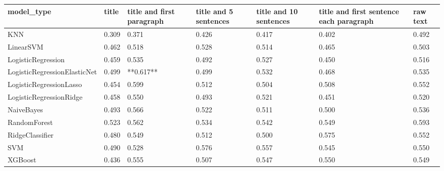 \begin{tabular}{lllllll}
\toprule
                  model\_type & title & title and first paragraph & title and 5 sentences & title and 10 sentences & title and first sentence each paragraph & raw text \\
\midrule
                         KNN & 0.309 &                     0.371 &                 0.426 &                  0.417 &                                   0.402 &    0.492 \\
                   LinearSVM & 0.462 &                     0.518 &                 0.528 &                  0.514 &                                   0.465 &    0.503 \\
          LogisticRegression & 0.459 &                     0.535 &                 0.492 &                  0.527 &                                   0.450 &    0.516 \\
LogisticRegressionElasticNet & 0.499 &                 **0.617** &                 0.499 &                  0.532 &                                   0.468 &    0.535 \\
     LogisticRegressionLasso & 0.454 &                     0.599 &                 0.512 &                  0.504 &                                   0.508 &    0.552 \\
     LogisticRegressionRidge & 0.458 &                     0.550 &                 0.493 &                  0.521 &                                   0.451 &    0.520 \\
                  NaiveBayes & 0.493 &                     0.566 &                 0.522 &                  0.511 &                                   0.500 &    0.536 \\
                RandomForest & 0.523 &                     0.562 &                 0.534 &                  0.542 &                                   0.549 &    0.593 \\
             RidgeClassifier & 0.480 &                     0.549 &                 0.512 &                  0.500 &                                   0.575 &    0.552 \\
                         SVM & 0.490 &                     0.528 &                 0.576 &                  0.557 &                                   0.545 &    0.550 \\
                     XGBoost & 0.436 &                     0.555 &                 0.507 &                  0.547 &                                   0.550 &    0.549 \\
\bottomrule
\end{tabular}
